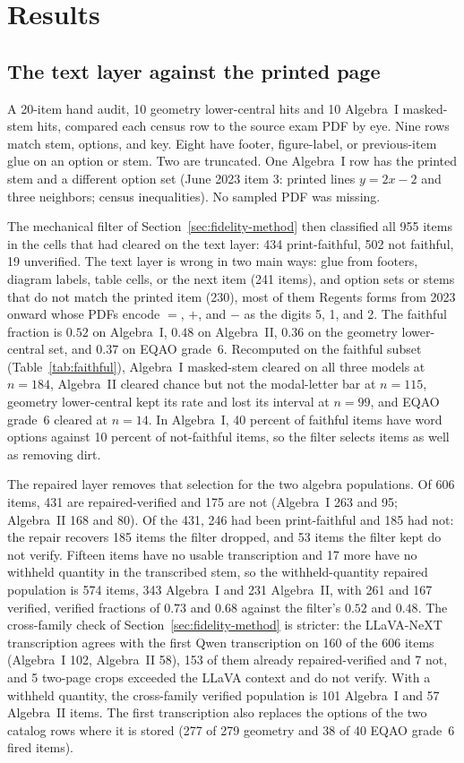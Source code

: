 \section{Results}
\label{sec:results}

\subsection{The text layer against the printed page}
\label{sec:print-audit}

A 20-item hand audit, 10 geometry lower-central hits and 10 Algebra~I masked-stem hits, compared each census row to the source exam PDF by eye. Nine rows match stem, options, and key. Eight have footer, figure-label, or previous-item glue on an option or stem. Two are truncated. One Algebra~I row has the printed stem and a different option set (June 2023 item 3: printed lines $y=2x-2$ and three neighbors; census inequalities). No sampled PDF was missing.

The mechanical filter of Section~\ref{sec:fidelity-method} then classified all 955 items in the cells that had cleared on the text layer: 434 print-faithful, 502 not faithful, 19 unverified. The text layer is wrong in two main ways: glue from footers, diagram labels, table cells, or the next item (241 items), and option sets or stems that do not match the printed item (230), most of them Regents forms from 2023 onward whose PDFs encode $=$, $+$, and $-$ as the digits 5, 1, and 2. The faithful fraction is $0.52$ on Algebra~I, $0.48$ on Algebra~II, $0.36$ on the geometry lower-central set, and $0.37$ on EQAO grade~6. Recomputed on the faithful subset (Table~\ref{tab:faithful}), Algebra~I masked-stem cleared on all three models at $n=184$, Algebra~II cleared chance but not the modal-letter bar at $n=115$, geometry lower-central kept its rate and lost its interval at $n=99$, and EQAO grade~6 cleared at $n=14$. In Algebra~I, 40 percent of faithful items have word options against 10 percent of not-faithful items, so the filter selects items as well as removing dirt.

The repaired layer removes that selection for the two algebra populations. Of 606 items, 431 are repaired-verified and 175 are not (Algebra~I 263 and 95; Algebra~II 168 and 80). Of the 431, 246 had been print-faithful and 185 had not: the repair recovers 185 items the filter dropped, and 53 items the filter kept do not verify. Fifteen items have no usable transcription and 17 more have no withheld quantity in the transcribed stem, so the withheld-quantity repaired population is 574 items, 343 Algebra~I and 231 Algebra~II, with 261 and 167 verified, verified fractions of $0.73$ and $0.68$ against the filter's $0.52$ and $0.48$. The cross-family check of Section~\ref{sec:fidelity-method} is stricter: the LLaVA-NeXT transcription agrees with the first Qwen transcription on 160 of the 606 items (Algebra~I 102, Algebra~II 58), 153 of them already repaired-verified and 7 not, and 5 two-page crops exceeded the LLaVA context and do not verify. With a withheld quantity, the cross-family verified population is 101 Algebra~I and 57 Algebra~II items. The first transcription also replaces the options of the two catalog rows where it is stored (277 of 279 geometry and 38 of 40 EQAO grade~6 fired items).

